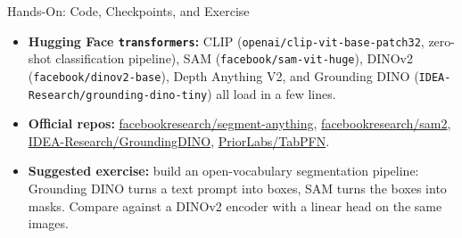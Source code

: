 \begin{frame}{Hands-On: Code, Checkpoints, and Exercise}
  \begin{itemize}\itemsep0.3em
    \item[\textcolor{red}{$\blacktriangleright$}] \textbf{Hugging Face \texttt{transformers}:} CLIP (\texttt{openai/clip-vit-base-patch32}, zero-shot classification pipeline), SAM (\texttt{facebook/sam-vit-huge}), DINOv2 (\texttt{facebook/dinov2-base}), Depth Anything V2, and Grounding DINO (\texttt{IDEA-Research/grounding-dino-tiny}) all load in a few lines.
    \item[\textcolor{red}{$\blacktriangleright$}] \textbf{Official repos:} \href{https://github.com/facebookresearch/segment-anything}{facebookresearch/segment-anything}, \href{https://github.com/facebookresearch/sam2}{facebookresearch/sam2}, \href{https://github.com/IDEA-Research/GroundingDINO}{IDEA-Research/GroundingDINO}, \href{https://github.com/PriorLabs/TabPFN}{PriorLabs/TabPFN}.
    \item[\textcolor{red}{$\blacktriangleright$}] \textbf{Suggested exercise:} build an open-vocabulary segmentation pipeline: Grounding DINO turns a text prompt into boxes, SAM turns the boxes into masks. Compare against a DINOv2 encoder with a linear head on the same images.
  \end{itemize}
\end{frame}
